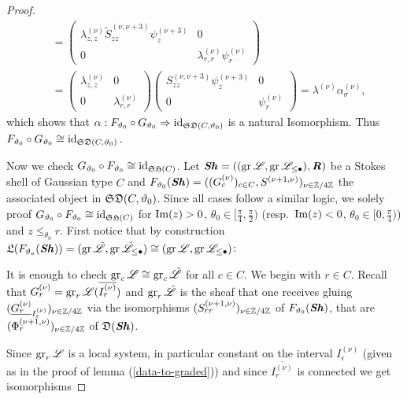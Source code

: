 \begin{proof}
\begin{align*}
& = \begin{pmatrix}
    \lambda_{z,z}^{(\nu)}\tilde{S}_{zz}^{(\nu,\nu+3)}\psi_z^{(\nu+3)} & 0 \\
    0 & \lambda_{r,r}^{(\nu)}\psi_r^{(\nu)}
\end{pmatrix} \\ & = \begin{pmatrix}
\lambda_{z,z}^{(\nu)} & 0 \\ 0 & \lambda_{r,r}^{(\nu)} \end{pmatrix} \begin{pmatrix}
    S_{zz}^{(\nu,\nu+3)}\psi_z^{(\nu+3)} & 0 \\
    0 & \psi_r^{(\nu)}
\end{pmatrix}
= \lambda^{(\nu)}\alpha_{\sigma}^{(\nu)},
\end{align*}
which shows that $\alpha: F_{\vartheta_0}\circ G_{\vartheta_0} \Rightarrow \operatorname{id}_{\mathfrak{SD}(C,\vartheta_0)}$ is a natural Isomorphism. Thus $F_{\vartheta_0} \circ G_{\vartheta_0} \cong \operatorname{id}_{\mathfrak{SD}(C,\vartheta_0)}.$
~\newline

Now we check $G_{\vartheta_0}\circ F_{\vartheta_0} \cong \operatorname{id}_{\mathfrak{SH}(C)}$. Let $\bm{\mathit{Sh}} =((\operatorname{gr}\mathscr{L},\operatorname{gr}\mathscr{L}_{\leq \bullet}),\bm{\mathit{R}})$ be a Stokes shell of Gaussian type $C$ and $F_{\vartheta_0}(\bm{\mathit{Sh}}) = ((G_c^{(\nu)})_{c \in C}, S^{(\nu+1,\nu)})_{\nu \in \mathbb{Z}/4\mathbb{Z}}$ the associated object in $\mathfrak{SD}(C,\vartheta_0)$. Since all cases follow a similar logic, we solely proof $G_{\vartheta_0}\circ F_{\vartheta_0} \cong \operatorname{id}_{\mathfrak{SH}(C)}$ for $\operatorname{Im}(z) >0$, $\theta_0 \in [\frac{\pi}{4}, \frac{\pi}{2})$ (resp.\ $\operatorname{Im}(z) <0$, $\theta_0 \in [0, \frac{\pi}{4})$) and $z\leq_{\theta_0}r$. First notice that by construction $\mathfrak{L}(F_{\vartheta_o}(\bm{\mathit{Sh}}))=(\operatorname{gr}\tilde{\mathscr{L}},\operatorname{gr}\tilde{\mathscr{L}}_{\leq \bullet}) \cong (\operatorname{gr}\mathscr{L},\operatorname{gr}\mathscr{L}_{\leq \bullet})$: 

It is enough to check $\operatorname{gr}_c\mathscr{L} \cong \operatorname{gr}_c\tilde{\mathscr{L}}$ for all $c \in C$. We begin with $r \in C$. Recall that $G_r^{(\nu)} = \operatorname{gr}_r\mathscr{L}(\overline{I_r^{(\nu)}})$ and $\operatorname{gr}_r\tilde{\mathscr{L}}$ is the sheaf that one receives gluing $(\underline{G_r^{(\nu)}}_{I^{(\nu)}_\varepsilon})_{\nu \in \mathbb{Z}/4\mathbb{Z}}$ via the isomorphisms $(S_{rr}^{(\nu+1,\nu)})_{\nu \in \mathbb{Z}/4\mathbb{Z}}$ of $F_{\vartheta_0}(\bm{\mathit{Sh}})$, that are $(\Phi_r^{(\nu+1,\nu)})_{\nu \in \mathbb{Z}/4\mathbb{Z}}$ of $\mathfrak{D}(\bm{\mathit{Sh}})$. 

Since $\operatorname{gr}_r\mathscr{L}$ is a local system, in particular constant on  the interval $I^{(\nu)}_\epsilon$ (given as in the proof of lemma (\ref{data-to-graded})) and since $\overline{I_r^{(\nu)}}$ is connected we get isomorphisms


\end{proof}
